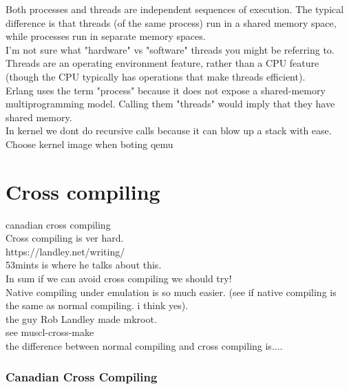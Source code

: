\documentclass[11pt, a4paper, oneside]{article}
\theoremstyle{definition}
\begin{document}
Both processes and threads are independent sequences of execution. The typical difference is that threads (of the same process) run in a shared memory space, while processes run in separate memory spaces.\\

I'm not sure what "hardware" vs "software" threads you might be referring to. Threads are an operating environment feature, rather than a CPU feature (though the CPU typically has operations that make threads efficient).\\

Erlang uses the term "process" because it does not expose a shared-memory multiprogramming model. Calling them "threads" would imply that they have shared memory.\\


In kernel we dont do recursive calls because it can blow up a stack with ease.\\


Choose kernel image when boting qemu\\


\vfill
\pagebreak
\section{Cross compiling}
canadian cross compiling\\
Cross compiling is ver hard. \\
https://landley.net/writing/\\
53mints is where he talks about this.\\

In sum if we can avoid cross compiling we should try!\\

Native compiling under emulation is so much easier. (see if native compiling is the same as normal compiling. i think yes).\\

the guy Rob Landley made mkroot.\\

see muscl-cross-make\\

the difference between normal compiling and cross compiling is....

\subsubsection{Canadian Cross Compiling}
\end{document}
